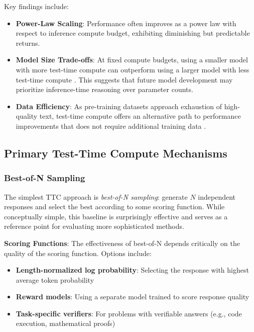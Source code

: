 Key findings include:

\begin{itemize}
    \item \textbf{Power-Law Scaling}: Performance often improves as a power law with respect to inference compute budget, exhibiting diminishing but predictable returns.
    
    \item \textbf{Model Size Trade-offs}: At fixed compute budgets, using a smaller model with more test-time compute can outperform using a larger model with less test-time compute \citep{snell2024scaling}. This suggests that future model development may prioritize inference-time reasoning over parameter counts.
    
    \item \textbf{Data Efficiency}: As pre-training datasets approach exhaustion of high-quality text, test-time compute offers an alternative path to performance improvements that does not require additional training data \citep{mit2025scaling}.
\end{itemize}

\subsection{Primary Test-Time Compute Mechanisms}

\subsubsection{Best-of-N Sampling}

The simplest TTC approach is \textit{best-of-N sampling}: generate $N$ independent responses and select the best according to some scoring function. While conceptually simple, this baseline is surprisingly effective and serves as a reference point for evaluating more sophisticated methods.

\textbf{Scoring Functions}: The effectiveness of best-of-N depends critically on the quality of the scoring function. Options include:
\begin{itemize}
    \item \textbf{Length-normalized log probability}: Selecting the response with highest average token probability
    \item \textbf{Reward models}: Using a separate model trained to score response quality
    \item \textbf{Task-specific verifiers}: For problems with verifiable answers (e.g., code execution, mathematical proofs)
\end{itemize}

